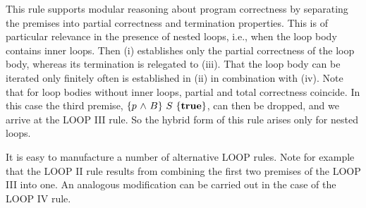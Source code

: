 \documentclass[manuscript, screen, review]{acmart}
\begin{document}
This rule supports modular reasoning about program correctness
by separating the premises into partial correctness and termination
properties.  This is of particular relevance in the presence of nested
loops, i.e., when the loop body contains inner loops.  Then (i)
establishes only the partial correctness of the loop body, whereas its
termination is relegated to (iii). That the loop body can be iterated
only finitely often is established in (ii) in combination with (iv).
Note that for loop bodies without inner loops, partial and total
correctness coincide. In this case the third premise,
$\mbox{$\{{p \mbox{$\ \wedge\ $} B}\}\ {S}\ \{{\mathbf{true}}\}$}$, can then be dropped, and we arrive at
the LOOP III rule. So the hybrid form of this rule arises only for
nested loops.


It is easy to manufacture a number of alternative LOOP rules. 
Note for example that the LOOP II rule results from combining the first two
premises of the LOOP III into one.  An analogous modification can be
carried out in the case of the LOOP IV rule. 




\end{document}
